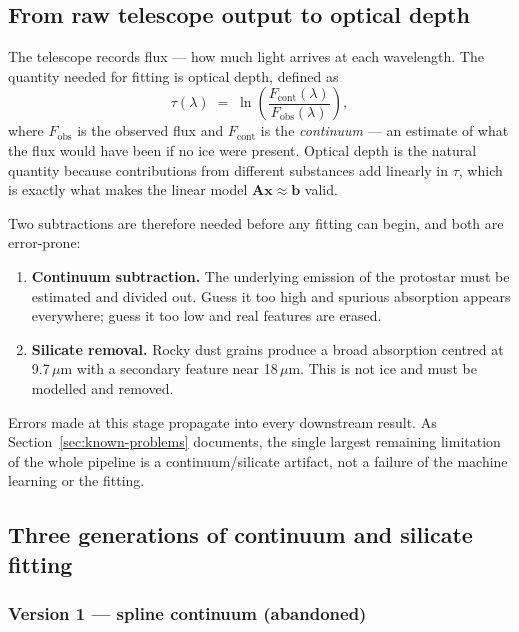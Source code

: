 \documentclass[11pt,a4paper]{article}
\newcommand{\um}{\,$\mu$m}
\begin{document}
\subsection{From raw telescope output to optical depth}

The telescope records flux --- how much light arrives at each wavelength.
The quantity needed for fitting is optical depth, defined as
\[
  \tau(\lambda) \;=\; \ln\!\left(\frac{F_{\text{cont}}(\lambda)}
                                      {F_{\text{obs}}(\lambda)}\right),
\]
where $F_{\text{obs}}$ is the observed flux and $F_{\text{cont}}$ is the
\emph{continuum} --- an estimate of what the flux would have been if no ice
were present. Optical depth is the natural quantity because contributions
from different substances add linearly in $\tau$, which is exactly what
makes the linear model $\mathbf{Ax}\approx\mathbf{b}$ valid.

Two subtractions are therefore needed before any fitting can begin, and
both are error-prone:

\begin{enumerate}
  \item \textbf{Continuum subtraction.} The underlying emission of the
        protostar must be estimated and divided out. Guess it too high and
        spurious absorption appears everywhere; guess it too low and real
        features are erased.
  \item \textbf{Silicate removal.} Rocky dust grains produce a broad
        absorption centred at 9.7\um{} with a secondary feature near
        18\um. This is not ice and must be modelled and removed.
\end{enumerate}

\begin{warnbox}
Errors made at this stage propagate into every downstream result. As
Section~\ref{sec:known-problems} documents, the single largest remaining
limitation of the whole pipeline is a continuum/silicate artifact, not a
failure of the machine learning or the fitting.
\end{warnbox}

\subsection{Three generations of continuum and silicate fitting}

\subsubsection*{Version 1 --- spline continuum (abandoned)}
\end{document}
